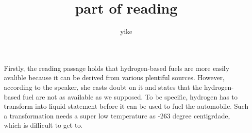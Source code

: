 \documentclass[a4paper, 10pt]{article}
\begin{document}
\title{{ \textbf {part of reading}}}
  \author{yike}
  \date{}
  
  \maketitle


  Firstly, the reading passage holds that hydrogen-based fuels are more easily avalible because it can be derived from various plentiful sources. However, according to the speaker, she casts doubt on it and states that the hydrogen-based fuel are not as available as we supposed. To be specific, hydrogen has to transform into liquid statement before it can be used to fuel the automobile. Such a transformation needs  a super low temperature as -263 degree centigrdade, which is difficult to get to.
\end{document}
